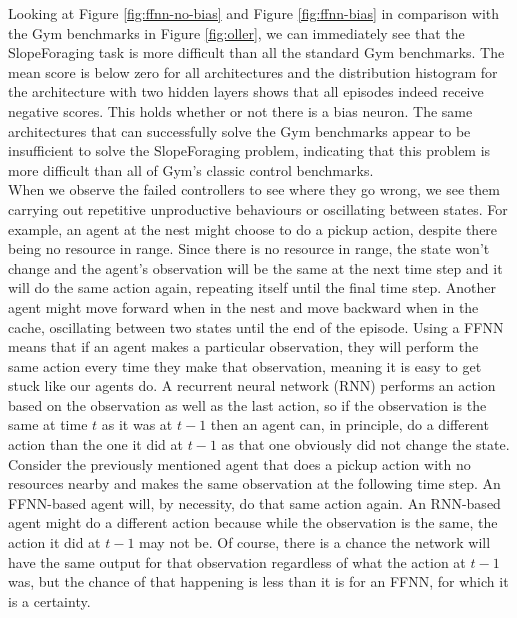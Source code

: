 \documentclass[12pt]{article}
\begin{document}
Looking at Figure \ref{fig:ffnn-no-bias} and Figure \ref{fig:ffnn-bias} in comparison with the Gym benchmarks in Figure \ref{fig:oller}, we can immediately see that the SlopeForaging task is more difficult than all the standard Gym benchmarks.
The mean score is below zero for all architectures and the distribution histogram for the architecture with two hidden layers shows that all episodes indeed receive negative scores.
This holds whether or not there is a bias neuron.
The same architectures that can successfully solve the Gym benchmarks appear to be insufficient to solve the SlopeForaging problem, indicating that this problem is more difficult than all of Gym's classic control benchmarks.\\

When we observe the failed controllers to see where they go wrong, we see them carrying out repetitive unproductive behaviours or oscillating between states.
For example, an agent at the nest might choose to do a pickup action, despite there being no resource in range.
Since there is no resource in range, the state won't change and the agent's observation will be the same at the next time step and it will do the same action again, repeating itself until the final time step.
Another agent might move forward when in the nest and move backward when in the cache, oscillating between two states until the end of the episode.
Using a FFNN means that if an agent makes a particular observation, they will perform the same action every time they make that observation, meaning it is easy to get stuck like our agents do.
A recurrent neural network (RNN) performs an action based on the observation as well as the last action, so if the observation is the same at time $t$ as it was at $t-1$ then an agent can, in principle, do a different action than the one it did at $t-1$ as that one obviously did not change the state.
Consider the previously mentioned agent that does a pickup action with no resources nearby and makes the same observation at the following time step.
An FFNN-based agent will, by necessity, do that same action again.
An RNN-based agent might do a different action because while the observation is the same, the action it did at $t-1$ may not be.
Of course, there is a chance the network will have the same output for that observation regardless of what the action at $t-1$ was, but the chance of that happening is less than it is for an FFNN, for which it is a certainty.\\
\end{document}
